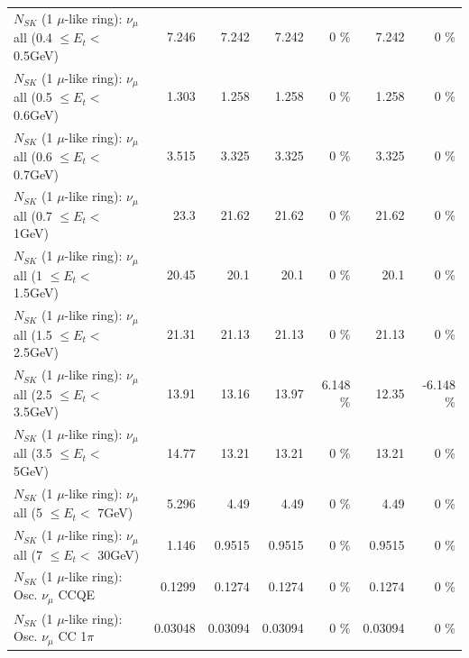 \begin{table}
\begin{tabular}{| l | r | r | r  r | r  r |}
       $N_{SK}$ (1 $\mu$-like ring): $\nu_{\mu}$ all (0.4 $\leq E_{t} <$ 0.5GeV) &           7.246 &           7.242 &           7.242 &        0 \%  &           7.242 &        0 \%  \\ 
       $N_{SK}$ (1 $\mu$-like ring): $\nu_{\mu}$ all (0.5 $\leq E_{t} <$ 0.6GeV) &           1.303 &           1.258 &           1.258 &        0 \%  &           1.258 &        0 \%  \\ 
       $N_{SK}$ (1 $\mu$-like ring): $\nu_{\mu}$ all (0.6 $\leq E_{t} <$ 0.7GeV) &           3.515 &           3.325 &           3.325 &        0 \%  &           3.325 &        0 \%  \\ 
         $N_{SK}$ (1 $\mu$-like ring): $\nu_{\mu}$ all (0.7 $\leq E_{t} <$ 1GeV) &            23.3 &           21.62 &           21.62 &        0 \%  &           21.62 &        0 \%  \\ 
         $N_{SK}$ (1 $\mu$-like ring): $\nu_{\mu}$ all (1 $\leq E_{t} <$ 1.5GeV) &           20.45 &            20.1 &            20.1 &        0 \%  &            20.1 &        0 \%  \\ 
       $N_{SK}$ (1 $\mu$-like ring): $\nu_{\mu}$ all (1.5 $\leq E_{t} <$ 2.5GeV) &           21.31 &           21.13 &           21.13 &        0 \%  &           21.13 &        0 \%  \\ 
       $N_{SK}$ (1 $\mu$-like ring): $\nu_{\mu}$ all (2.5 $\leq E_{t} <$ 3.5GeV) &           13.91 &           13.16 &           13.97 &    6.148 \%  &           12.35 &   -6.148 \%  \\ 
         $N_{SK}$ (1 $\mu$-like ring): $\nu_{\mu}$ all (3.5 $\leq E_{t} <$ 5GeV) &           14.77 &           13.21 &           13.21 &        0 \%  &           13.21 &        0 \%  \\ 
           $N_{SK}$ (1 $\mu$-like ring): $\nu_{\mu}$ all (5 $\leq E_{t} <$ 7GeV) &           5.296 &            4.49 &            4.49 &        0 \%  &            4.49 &        0 \%  \\ 
          $N_{SK}$ (1 $\mu$-like ring): $\nu_{\mu}$ all (7 $\leq E_{t} <$ 30GeV) &           1.146 &          0.9515 &          0.9515 &        0 \%  &          0.9515 &        0 \%  \\ 
\hline
\hline
                               $N_{SK}$ (1 $\mu$-like ring): Osc. $\nu_\mu$ CCQE &          0.1299 &          0.1274 &          0.1274 &        0 \%  &          0.1274 &        0 \%  \\ 
                          $N_{SK}$ (1 $\mu$-like ring): Osc. $\nu_\mu$ CC 1$\pi$ &         0.03048 &         0.03094 &         0.03094 &        0 \%  &         0.03094 &        0 \%  \\ 

\end{tabular}
\end{table}
